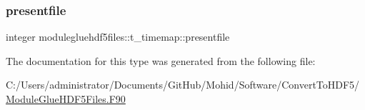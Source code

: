 \mbox{\label{structmodulegluehdf5files_1_1t__timemap_a4656aa2b11dd4b32ff69729db07ea415}} 
\subsubsection{\texorpdfstring{presentfile}{presentfile}}
{\footnotesize\ttfamily integer modulegluehdf5files\+::t\+\_\+timemap\+::presentfile\hspace{0.3cm}{\ttfamily [private]}}



The documentation for this type was generated from the following file\+:\begin{DoxyCompactItemize}
\item 
C\+:/\+Users/administrator/\+Documents/\+Git\+Hub/\+Mohid/\+Software/\+Convert\+To\+H\+D\+F5/\mbox{\hyperlink{_module_glue_h_d_f5_files_8_f90}{Module\+Glue\+H\+D\+F5\+Files.\+F90}}\end{DoxyCompactItemize}
